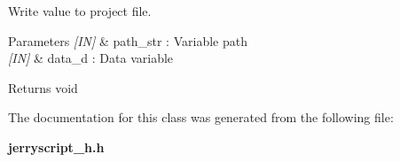 Write value to project file. 


\begin{DoxyCode}{0}
\end{DoxyCode}



\begin{DoxyParams}{Parameters}
{\em \mbox{[}\+I\+N\mbox{]}} & path\+\_\+str \+: Variable path \\
\hline
{\em \mbox{[}\+I\+N\mbox{]}} & data\+\_\+d \+: Data variable \\
\hline
\end{DoxyParams}
\begin{DoxyReturn}{Returns}
void 
\end{DoxyReturn}


The documentation for this class was generated from the following file\+:\begin{DoxyCompactItemize}
\item 
\textbf{ jerryscript\+\_\+h.\+h}\end{DoxyCompactItemize}
